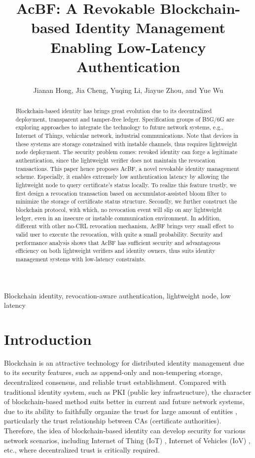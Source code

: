 \documentclass[conference]{IEEEtran}
\title{AcBF: A Revokable Blockchain-based Identity Management Enabling Low-Latency Authentication}
\author{Jianan Hong, Jia Cheng, Yuqing Li, Jiayue Zhou, and Yue Wu}
\begin{document}
\maketitle

\begin{abstract}
	Blockchain-based identity has brings great evolution due to its decentralized deployment, transparent and tamper-free ledger. Specification groups of B5G/6G are exploring approaches to integrate the technology to future network systems, e.g., Internet of Things, vehicular network, industrial communications. Note that devices in these systems are storage constrained with instable channels, thus requires lightweight node deployment. The security problem comes: revoked identity can forge a legitimate authentication, since the lightweight verifier does not maintain the revocation transactions. 
	This paper hence proposes AcBF, a novel revokable identity management scheme. Especially, it enables extremely low authentication latency by allowing the lightweight node to query certificate's status locally. To realize this feature trustly, we first design a revocation transaction based on accumulator-assisted bloom filter to minimize the storage of certificate status structure. Secondly, we further construct the blockchain protocol, with which, no revocation event will slip on any lightweight ledger, even in an insecure or instable communication environment.  
	In addition, different with other no-CRL revocation mechanism, AcBF brings very small effect to valid user to execute the revocation, with quite a small probability.
	Security and performance analysis
	shows that AcBF has sufficient security and advantageous efficiency on both lightweight verifiers and identity owners, thus suits identity management systems with low-latency constraints.
\end{abstract}
\begin{IEEEkeywords}
    Blockchain identity, revocation-aware authentication, lightweight node, low latency
\end{IEEEkeywords}

\section{Introduction}
Blockchain is an attractive technology for distributed identity management \cite{9075663} due to its security features, such as append-only and non-tempering storage, decentralized consensus, and reliable trust establishment. Compared with traditional identity system, such as PKI (public key infrastructure), the character of blockchain-based method suits better in current and future network systems, due to its ability to faithfully organize the trust for large amount of entities \cite{certchain2018,yang2018blockchain}, particularly the trust relationship between CAs (certificate authorities). 
Therefore, the idea of blockchain-based identity can develop security for various network scenarios, including Internet of Thing (IoT) \cite{zhangBPAFBlockchainEnabledReliable2022a}, Internet of Vehicles (IoV)  \cite{8010820,singh2018branch}, etc., where decentralized trust is critically required. 
\end{document}
